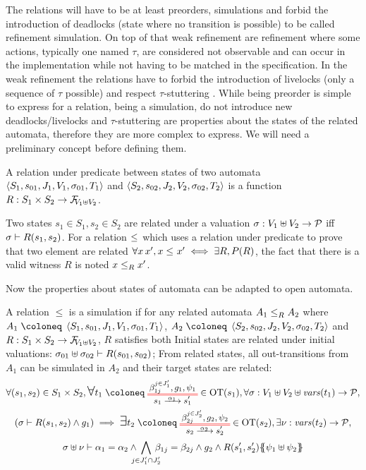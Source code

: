 \documentclass{article}
\begin{document}
The relations will have to be at least preorders, simulations and forbid the introduction of deadlocks (state where no transition is possible) to be called refinement simulation.
On top of that weak refinement are refinement where some actions, typically one named \(\tau\), are considered not observable and can occur in the implementation while not having to be matched in the specification.
In the weak refinement the relations have to forbid the introduction of livelocks (only a sequence of \(\tau\) possible) and respect \(\tau\)-stuttering .
While being preorder is simple to express for a relation, being a simulation, do not introduce new deadlocks/livelocks and \(\tau\)-stuttering are properties about the states of the related automata, therefore they are more complex to express.
We will need a preliminary concept before defining them.
\begin{defi}
A relation under predicate between states of two automata \(\OA{S_1}{s_{01}}{J_1}{V_1}{\sigma_{01}}{T_1}\) and \(\OA{S_2}{s_{02}}{J_2}{V_2}{\sigma_{02}}{T_2}\) is a function \(R: S_1 \times S_2 \to \rformulae[V_1 \uplus V_2]\).

Two states \(s_1 \in S_1, s_2 \in S_2\) are related under a valuation \(\sigma: V_1 \uplus V_2 \to \values\) iff \(\sigma \vdash R\mpar{s_1, s_2}\).
For a relation \(\wrel{}{}{}\) which uses a relation under predicate to prove that two element are related \(\forall x \, x', x \wrel{}{}{} x' \iff \exists R, P\mpar{R}\), the fact that there is a valid witness \(R\) is noted \(\wrel{x}{x'}{R}\).
\end{defi}
Now the properties about states of automata can be adapted to open automata.
\begin{defi}
A relation \(\leq\) is a simulation if for any related automata \(\wrel{A_1}{A_2}{R}\) where \(A_1 \defobject \OA{S_1}{s_{01}}{J_1}{V_1}{\sigma_{01}}{T_1}\), \(A_2 \defobject \OA{S_2}{s_{02}}{J_2}{V_2}{\sigma_{02}}{T_2}\) and \(R: S_1 \times S_2 \to \rformulae[V_1 \uplus V_2]\), \(R\) satisfies both
 Initial states are related under initial valuations: \(\sigma_{01} \uplus \sigma_{02} \vdash R\mpar{s_{01}, s_{02}}\);
 From related states, all out-transitions from \(A_1\) can be simulated in \(A_2\) and their target states are related:
\begin{multline*}
	\forall \mpar{s_1, s_2} \in S_1 \times S_2, \bigsymb{\forall} t_1 \defobject \OTx{1}{}{1}{1} \in \fOT{s_1}, \forall \sigma: V_1 \uplus V_2 \uplus \fvars{t_1} \to \values, \\
	\mpar{\sigma \vdash R\mpar{s_1, s_2} \wedge g_1} \implies \bigsymb{\exists} t_2 \defobject \OTx{2}{}{2}{2} \in \fOT{s_2}, \exists \nu: \fvars{t_2} \to \values, \\
	\sigma \uplus \nu \vdash \alpha_1 = \alpha_2 \wedge \bigwedge_\subbox{j \in J'_1 \cap J'_2} \beta_{1j} = \beta_{2j} \wedge g_2 \wedge R\mpar{s'_1, s'_2}\psubst{\psi_1 \uplus \psi_2}
\end{multline*}
\end{defi}
\end{document}
